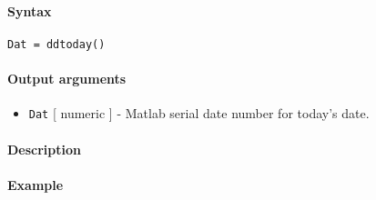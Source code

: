 


	\paragraph{Syntax}\label{syntax}

\begin{verbatim}
Dat = ddtoday()
\end{verbatim}

\paragraph{Output arguments}\label{output-arguments}

\begin{itemize}
\itemsep1pt\parskip0pt
\item
  \texttt{Dat} {[} numeric {]} - Matlab serial date number for today's
  date.
\end{itemize}

\paragraph{Description}\label{description}

\paragraph{Example}\label{example}


